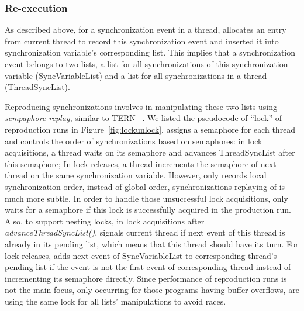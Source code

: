  
\subsubsection{Re-execution}
As described above, for a synchronization event in a thread,
\doubletake{} allocates an entry from current thread to record this synchronization event 
and inserted it into synchronization variable's corresponding list. 
This implies that a synchronization event belongs to two lists, 
a list for all synchronizations of this synchronization variable (SyncVariableList) and 
a list for all synchronizations in a thread (ThreadSyncList). 

Reproducing synchronizations involves in manipulating these two lists using 
{\it sempaphore replay}, similar to TERN ~\cite{TERN}.
We listed the pseudocode of ``lock'' of reproduction runs in Figure~\ref{fig:lockunlock}.
\doubletake{} assigns a semaphore for each thread and controls the order 
of synchronizations based on semaphores: in lock acquisitions, 
a thread waits on its semaphore and advances ThreadSyncList after this semaphore; 
In lock releases, a thread increments the semaphore of next thread on the same 
synchronization variable.
However, \doubletake{} only records local synchronization order, instead of global order,
synchronizations replaying of \doubletake{} is much more subtle.
In order to handle those unsuccessful lock acquisitions, \doubletake{} only waits for a semaphore 
if this lock is successfully acquired in the production run. 
Also, to support nesting locks, in lock acquisitions after {\it advanceThreadSyncList()}, 
\doubletake{} signals current thread if next event of this thread is already 
in its pending list, which means that this thread should have its turn.
For lock releases, \doubletake{} adds next event of SyncVariableList to corresponding thread's 
pending list if the event is not the first event of corresponding thread instead of incrementing
its semaphore directly. 
Since performance of reproduction runs is not the main focus, only occurring for those programs 
having buffer overflows, \doubletake{} are using the same lock for all lists' manipulations to
avoid races.  


